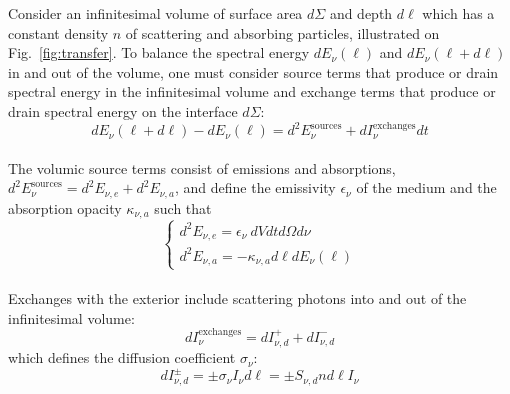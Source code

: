 Consider an infinitesimal volume of surface area $d\Sigma$ and depth $d\ell$ which has a constant density $n$ of scattering and absorbing particles, illustrated on Fig.~\ref{fig:transfer}. To balance the spectral energy $dE_\nu (\ell)$ and $dE_\nu (\ell + d\ell)$ in and out of the volume, one must consider source terms that produce or drain spectral energy in the infinitesimal volume and exchange terms that produce or drain spectral energy on the interface $d\Sigma$: \\
\begin{equation}
d E_\nu (\ell + d\ell) - d E_\nu (\ell) = d^2 E_\nu^{\mathrm{sources}} + d I_\nu^{\mathrm{exchanges}} dt
\end{equation} \\ The volumic source terms consist of emissions and absorptions, $d^2 E_\nu^{\mathrm{sources}} = d^2 E_{\nu, e} + d^2 E_{\nu, a}$, and define the emissivity $\epsilon_\nu$ of the medium and the absorption opacity $\kappa_{\nu, a}$ such that \\
\begin{equation}
\left\{
\begin{array}{l}
d^2 E_{\nu, e} = \epsilon_\nu ~dV dt d\Omega d\nu\\
d^2 E_{\nu, a} = - \kappa_{\nu, a} d\ell dE_\nu (\ell)
\end{array}
\right.
\end{equation} \\ Exchanges with the exterior include scattering photons into and out of the infinitesimal volume:
\begin{equation}
d I_\nu^{\mathrm{exchanges}} = d I_{\nu, d}^{+} + d I_{\nu, d}^{-} 
\end{equation} which defines the diffusion coefficient $\sigma_\nu$:
\begin{equation}
d I_{\nu, d}^{\pm} = \pm \sigma_\nu I_\nu d\ell = \pm S_{\nu, d} n d\ell I_\nu
\end{equation} \\

